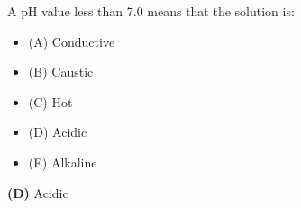 

A pH value less than 7.0 means that the solution is:

\begin{itemize}
\item{(A)} Conductive
\vskip 5pt 
\item{(B)} Caustic
\vskip 5pt 
\item{(C)} Hot
\vskip 5pt 
\item{(D)} Acidic
\vskip 5pt 
\item{(E)} Alkaline
\end{itemize}







{\bf (D)} Acidic
 










